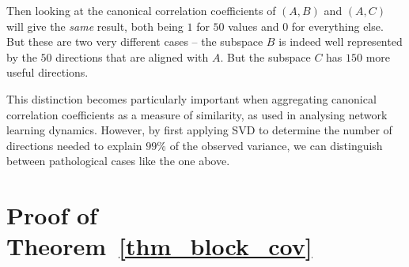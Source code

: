 \documentclass{article} %
\begin{document}
Then looking at the canonical correlation coefficients of $(A,B)$ and $(A,C)$ will give the \textit{same} result, both being $1$ for $50$ values and $0$ for everything else. But these are two very different cases -- the subspace $B$ is indeed well represented by the $50$ directions that are aligned with $A$. But the subspace $C$ has $150$ more useful directions. 

This distinction becomes particularly important when aggregating canonical correlation coefficients as a measure of similarity, as used in analysing network learning dynamics. However, by first applying SVD to determine the number of directions needed to explain $99\%$ of the observed variance, we can distinguish between pathological cases like the one above.


 


\section{Proof of Theorem~\ref{thm_block_cov}}
\label{app-fourier-proofs}
\end{document}
